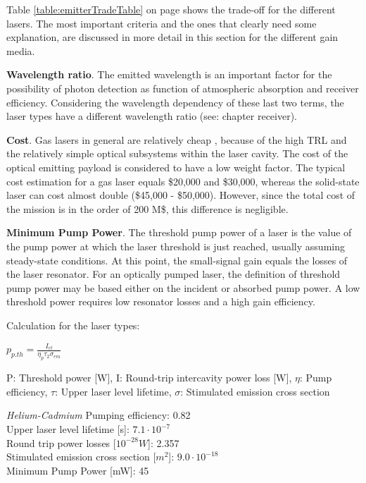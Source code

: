 Table \ref{table:emitterTradeTable} on page \pageref{table:emitterTradeTable} shows the trade-off for the different \acp{laser}. The most important  criteria and the ones that clearly need some explanation, are discussed in more detail in this section for the different gain media. 
	
\textbf{Wavelength ratio}. The emitted wavelength is an important factor for the possibility of photon detection as function of atmospheric absorption and receiver efficiency. Considering the wavelength dependency of these last two terms, the laser types have a different wavelength ratio (see: chapter receiver).

\textbf{Cost}. Gas \acs{laser}s in general are relatively cheap , because of the high \ac{TRL} and the relatively simple optical subsystems within the \acs{laser} cavity. The cost of the optical emitting payload is considered to have a low weight factor. The typical cost estimation for a gas \acs{laser} equals \$20,000 and \$30,000, whereas the solid-state \acs{laser} can cost almost double (\$45,000 - \$50,000). However, since the total cost of the mission is in the order of 200 M\$, this difference is negligible.
 
\textbf{Minimum Pump Power}. \cite{lasertech}The threshold pump power of a laser is the value of the pump power at which the laser threshold is just reached, usually assuming steady-state conditions. At this point, the small-signal gain equals the losses of the laser resonator. For an optically pumped laser, the definition of threshold pump power may be based either on the incident or absorbed pump power. A low threshold power requires low resonator losses and a high gain efficiency.

Calculation for the \acs{laser} types:

\begin{center}
$p_{p.th} = \frac{I_{rt}}{\eta_{p}\tau_{2}\sigma_{em}}$
\end{center}

P: Threshold power [W], I: Round-trip intercavity power loss [W], $\eta$: Pump efficiency, $\tau$: Upper laser level lifetime, $\sigma$: Stimulated emission cross section

\textit{Helium-Cadmium}
Pumping efficiency: 0.82\\
Upper \acs{laser} level lifetime [s]: $7.1\cdot10^{-7}$\\
Round trip power losses [$10^{-28} W$]: 2.357 \\
Stimulated emission cross section [$m^{2}$]: $9.0\cdot10^{-18}$\\
Minimum Pump Power [mW]: 45 

